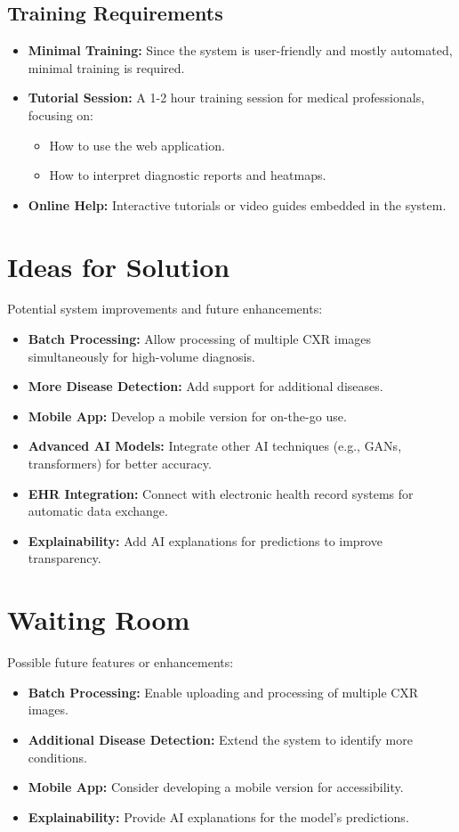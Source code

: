 \documentclass[12pt]{article}
\begin{document}
\subsection{Training Requirements}
\begin{itemize}
    \item \textbf{Minimal Training:} Since the system is user-friendly and mostly automated, minimal training is required.
    \item \textbf{Tutorial Session:} A 1-2 hour training session for medical professionals, focusing on:
    \begin{itemize}
        \item How to use the web application.
        \item How to interpret diagnostic reports and heatmaps.
    \end{itemize}
    \item \textbf{Online Help:} Interactive tutorials or video guides embedded in the system.
\end{itemize}


\section{Ideas for Solution}
Potential system improvements and future enhancements:
\begin{itemize}
    \item \textbf{Batch Processing:} Allow processing of multiple CXR images simultaneously for high-volume diagnosis.
    \item \textbf{More Disease Detection:} Add support for additional diseases.
    \item \textbf{Mobile App:} Develop a mobile version for on-the-go use.
    \item \textbf{Advanced AI Models:} Integrate other AI techniques (e.g., GANs, transformers) for better accuracy.
    \item \textbf{EHR Integration:} Connect with electronic health record systems for automatic data exchange.
    \item \textbf{Explainability:} Add AI explanations for predictions to improve transparency.
\end{itemize}

\section{Waiting Room}
Possible future features or enhancements:
\begin{itemize}
    \item \textbf{Batch Processing:} Enable uploading and processing of multiple CXR images.
    \item \textbf{Additional Disease Detection:} Extend the system to identify more conditions.
    \item \textbf{Mobile App:} Consider developing a mobile version for accessibility.
    \item \textbf{Explainability:} Provide AI explanations for the model's predictions.
\end{itemize}
\end{document}
